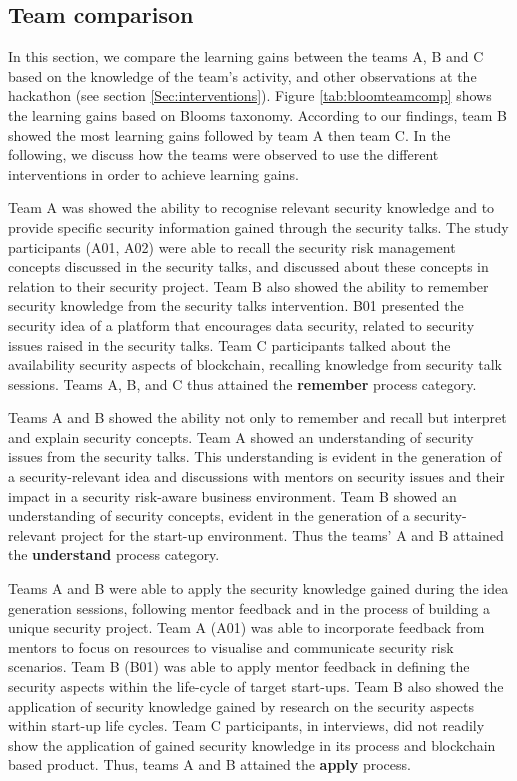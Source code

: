 \documentclass[runningheads]{llncs}
\begin{document}
\subsection{Team comparison} \label{teamcomparison}
In this section, we compare the learning gains between the teams A, B and C based on the knowledge of the team's activity, and other observations at the hackathon (see section \ref{Sec:interventions}). Figure \ref{tab:bloomteamcomp} shows the learning gains based on Blooms taxonomy.
According to our findings, team B showed the most learning gains followed by team A then team C. In the following, we discuss how the teams were observed to use the different interventions in order to achieve learning gains.

Team A was showed the ability to recognise relevant security knowledge and to provide specific security information gained through the security talks. The study participants (A01, A02) were able to recall the security risk management concepts discussed in the security talks, and discussed about these concepts in relation to their security project. 
Team B also showed the ability to remember security knowledge from the security talks intervention. B01 presented the security idea of a platform that encourages data security, related to security issues raised in the security talks. Team C participants talked about the availability security aspects of blockchain, recalling knowledge from security talk sessions. Teams A, B, and C thus attained the \textbf{remember} process category.

Teams A and B showed the ability not only to remember and recall but interpret and explain security concepts. Team A showed an understanding of security issues from the security talks. This understanding is evident in the generation of a security-relevant idea and discussions with mentors on security issues and their impact in a security risk-aware business environment. Team B showed an understanding of security concepts, evident in the generation of a security-relevant project for the start-up environment. Thus the teams' A and B attained the \textbf{understand} process category.

Teams A and B were able to apply the security knowledge gained during the idea generation sessions, following mentor feedback and in the process of building a unique security project.
Team A (A01) was able to incorporate feedback from mentors to focus on resources to visualise and communicate security risk scenarios. Team B (B01) was able to apply mentor feedback in defining the security aspects within the life-cycle of target start-ups. Team B also showed the application of security knowledge gained by research on the security aspects within start-up life cycles. Team C participants, in interviews, did not readily show the application of gained security knowledge in its process and blockchain based product. Thus, teams A and B attained the \textbf{apply} process.
\end{document}
